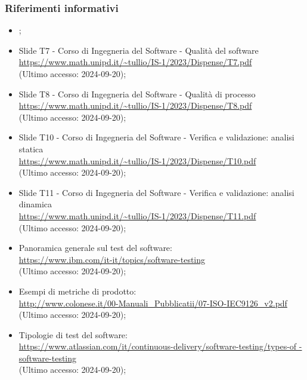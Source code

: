 \subsubsection{Riferimenti informativi}
\begin{itemize}
  \item \AnalisiDeiRequisiti;
  \item Slide T7 - Corso di Ingegneria del Software - Qualità del software \\ \href{https://www.math.unipd.it/~tullio/IS-1/2023/Dispense/T7.pdf}{https://www.math.unipd.it/\textasciitilde tullio/IS-1/2023/Dispense/T7.pdf}  \\ (Ultimo accesso: 2024-09-20);
  \item Slide T8 - Corso di Ingegneria del Software - Qualità di processo \\ \href{https://www.math.unipd.it/~tullio/IS-1/2023/Dispense/T8.pdf}{https://www.math.unipd.it/\textasciitilde tullio/IS-1/2023/Dispense/T8.pdf}  \\ (Ultimo accesso: 2024-09-20);
  \item Slide T10 - Corso di Ingegneria del Software - Verifica e validazione: analisi statica \\ \href{https://www.math.unipd.it/~tullio/IS-1/2023/Dispense/T10.pdf}{https://www.math.unipd.it/\textasciitilde tullio/IS-1/2023/Dispense/T10.pdf}  \\ (Ultimo accesso: 2024-09-20);
  \item Slide T11 - Corso di Ingegneria del Software - Verifica e validazione: analisi dinamica \\ \href{https://www.math.unipd.it/~tullio/IS-1/2023/Dispense/T11.pdf}{https://www.math.unipd.it/\textasciitilde tullio/IS-1/2023/Dispense/T11.pdf}  \\ (Ultimo accesso: 2024-09-20);
  \item Panoramica generale sul test del software: \\ \href{https://www.ibm.com/it-it/topics/software-testing}{https://www.ibm.com/it-it/topics/software-testing}  \\ (Ultimo accesso: 2024-09-20);
  \item Esempi di metriche di prodotto: \\ \href{http://www.colonese.it/00-Manuali_Pubblicatii/07-ISO-IEC9126_v2.pdf}{http://www.colonese.it/00-Manuali\_Pubblicatii/07-ISO-IEC9126\_v2.pdf} \\ (Ultimo accesso: 2024-09-20);
  \item Tipologie di test del software: \\ \href{https://www.atlassian.com/it/continuous-delivery/software-testing/types-of-software-testing}{https://www.atlassian.com/it/continuous-delivery/software-testing/types-of \- -software-testing}  \\ (Ultimo accesso: 2024-09-20);

\end{itemize}
